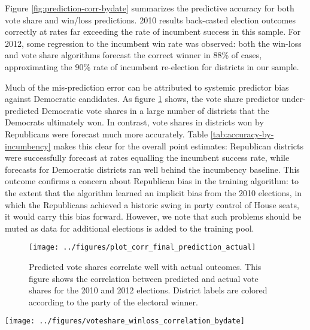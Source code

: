 \documentclass{acm_proc_article-sp}
\begin{document}
Figure \ref{fig:prediction-corr-bydate} summarizes the predictive
accuracy for both vote share and win/loss predictions. 2010 results
back-casted election outcomes correctly at rates far exceeding the
rate of incumbent success in this sample. For 2012, some regression to
the incumbent win rate was observed: both the win-loss and vote share
algorithms forecast the correct winner in 88\% of cases, approximating
the 90\% rate of incumbent re-election for districts in our sample.

Much of the mis-prediction error can be attributed to systemic
predictor bias against Democratic candidates. As figure
\ref{fig:corr-voteshare} shows, the vote share predictor
under-predicted Democratic vote shares in a large number of districts
that the Democrats ultimately won. In contrast, vote shares in districts
won by Republicans were forecast much more accurately. Table
\ref{tab:accuracy-by-incumbency} makes this clear for the overall
point estimates: Republican districts were successfully forecast at
rates equalling the incumbent success rate, while forecasts for
Democratic districts ran well behind the incumbency baseline. This outcome
confirms a concern about Republican bias in the training algorithm: to
the extent that the algorithm learned an implicit bias from the 2010
elections, in which the Republicans achieved a historic swing in party
control of House seats, it would carry this bias forward. However, we
note that such problems should be muted as data for additional
elections is added to the training pool. 



\begin{figure}[ht]
  \centering
  \texttt{[image: ../figures/plot\_corr\_final\_prediction\_actual]}
  \caption{Predicted vote shares correlate well with actual
    outcomes. This figure shows the correlation between predicted and
    actual vote shares for the 2010 and 2012 elections. District
    labels are colored according to the party of the electoral winner.}
  \label{fig:corr-voteshare}
\end{figure}

\begin{figure*}[ht]
  \centering
  \texttt{[image: ../figures/voteshare\_winloss\_correlation\_bydate]}
  \caption{Predictive algorithms provide accuracy leading
    forecasts. This figure shows the predictive accuracy of both the
    vote share and win/loss algorithms for each day in the general election campaign. Predictions are back-cast for the 2010 election, using the trained algorithm; and forecast for the 2012 election. Vote shares were converted to win/loss predictions at the 50\% cut point. Horizontal lines indicate the incumbent win rate for the districts in the total population of forecasted districts.}
  \label{fig:prediction-corr-bydate}
\end{figure*}
\end{document}
